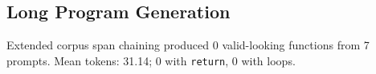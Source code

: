 \subsection{Long Program Generation}
Extended corpus span chaining produced 0 valid-looking functions from 7 prompts.
Mean tokens: 31.14; 0 with \texttt{return}, 0 with loops.

